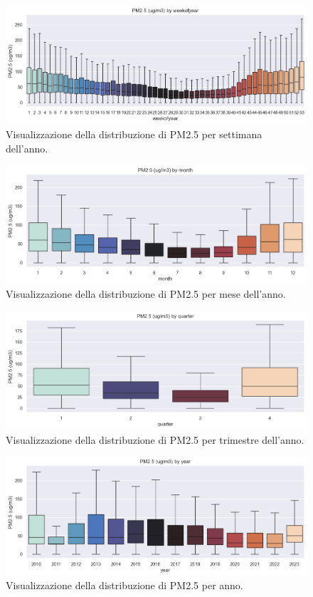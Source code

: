 \documentclass[a4paper,12pt]{report}
\begin{document}
	\begin{figure}[H]
		\centering
		\includegraphics[width=1.0\textwidth]{img/byweekofyear_pm.png}
		\caption{Visualizzazione della distribuzione di PM2.5 per settimana dell'anno.}
	\end{figure}
	\begin{figure}[H]
		\centering
		\includegraphics[width=1.0\textwidth]{img/bymonth_pm.png}
		\caption{Visualizzazione della distribuzione di PM2.5 per mese dell'anno.}
	\end{figure}
	\begin{figure}[H]
		\centering
		\includegraphics[width=1.0\textwidth]{img/byquarter_pm.png}
		\caption{Visualizzazione della distribuzione di PM2.5 per trimestre dell'anno.}
	\end{figure}
	\begin{figure}[H]
		\centering
		\includegraphics[width=1.0\textwidth]{img/byyear_pm.png}
		\caption{Visualizzazione della distribuzione di PM2.5 per anno.}
	\end{figure}
	
\end{document}
